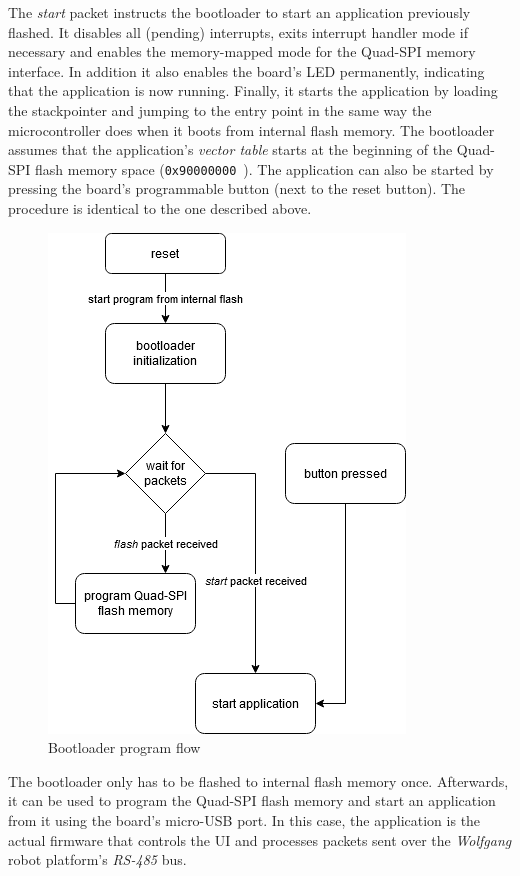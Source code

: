 The \textit{start} packet instructs the bootloader to start an application previously flashed. It
disables all (pending) interrupts, exits interrupt handler mode if necessary and enables the
memory-mapped mode for the Quad-SPI memory interface. In addition it also enables the board's LED
permanently, indicating that the application is now running. Finally, it starts the application by
loading the stackpointer and jumping to the entry point in the same way the microcontroller does
when it boots from internal flash memory. The bootloader assumes that the application's \textit{vector table}
starts at the beginning of the Quad-SPI flash memory space (\lstinline{0x90000000}~\cite{mcu-ref-manual}).
The application can also be started by pressing the board's programmable button (next to the reset
button). The procedure is identical to the one described above.

\begin{figure}[h]
    \centering
    \includegraphics[scale=0.7]{img/bootloader_flowchart.png}
    \caption{Bootloader program flow}
\end{figure}

The bootloader only has to be flashed to internal flash memory once. Afterwards, it can be used to
program the Quad-SPI flash memory and start an application from it using the board's micro-USB port.
In this case, the application is the actual firmware that controls the UI and processes packets
sent over the \textit{Wolfgang} robot platform's \textit{RS-485} bus.

